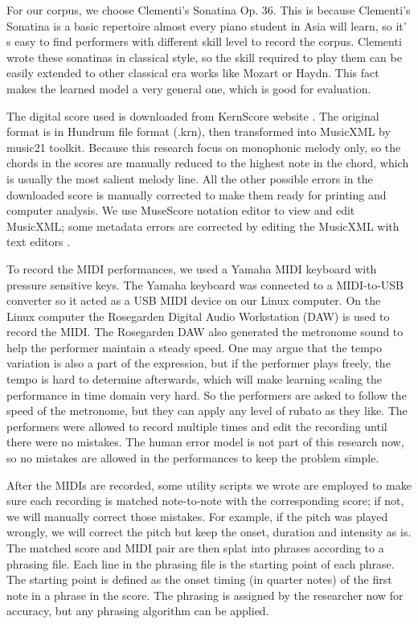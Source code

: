 For our corpus, we choose Clementi's Sonatina Op. 36.  This is because  Clementi's Sonatina is a basic repertoire almost every piano student in Asia will learn, so it' s easy to find performers with different skill level to record the corpus. Clementi wrote these sonatinas in classical style, so the skill required to play them can be easily extended to other classical era works like Mozart or Haydn. This fact makes the learned model a very general one, which is good for evaluation.

The digital score used is downloaded from KernScore website \cite{KernScores}. The original format is in Hundrum file format (.krn), then transformed into MusicXML by music21 toolkit. Because this research focus on monophonic melody only, so the chords in the scores are manually reduced to the highest note in the chord, which is usually the most salient melody line. All the other possible errors in the downloaded score is manually corrected to make them ready for printing and computer analysis. We use MuseScore notation editor to view and edit MusicXML; some metadata errors are corrected by editing the MusicXML with text editors .

To record the MIDI performances, we used a Yamaha MIDI keyboard with pressure sensitive keys. The Yamaha keyboard was connected to a MIDI-to-USB  converter so it acted as a USB MIDI device on our Linux computer. On the Linux computer the Rosegarden Digital Audio Workstation (DAW) is used to record the MIDI. The Rosegarden DAW also generated the metronome sound to help the performer maintain a steady speed. One may argue that the tempo variation is also a part of the expression, but if the performer plays freely, the tempo is hard to determine afterwards, which will make learning scaling the performance in time domain very hard. So the performers are asked to follow the speed of the metronome, but they can apply any level of rubato as they like. The performers were allowed to record multiple times and edit the recording until there were no mistakes. The human error model is not part of this research now, so no mistakes are allowed in the performances to keep the problem simple.

  After the MIDIs are recorded, some utility scripts we wrote are employed to  make sure each recording is matched note-to-note with the corresponding score; if not, we will manually correct those mistakes. For example, if the pitch was played wrongly, we will correct the pitch but keep the onset, duration  and intensity as is. The matched score and MIDI pair are then splat into phrases according to a phrasing file.  Each line in the phrasing file is the starting point of each phrase. The starting point is defined as the onset timing (in quarter notes) of the first note in a phrase in the score.  The phrasing is assigned by the researcher now for accuracy, but any phrasing algorithm can be applied.


